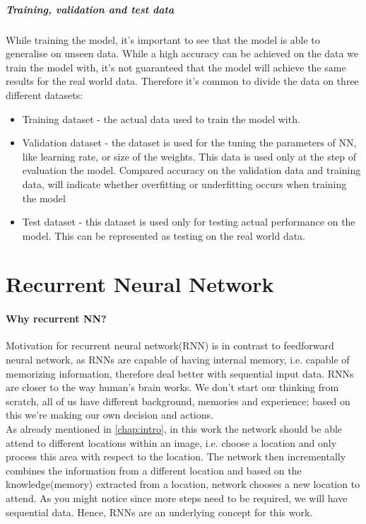 \subparagraph{Training, validation and test data} While training the model,
it's important to see that the model is able to generalise on unseen data.
While a high accuracy can be achieved on the data we train the model with, it's
not guaranteed that the model will achieve the same results for the real world
data. Therefore it's common to divide the data on three different datasets:
\begin{itemize}
	\item Training dataset - the actual data used to train the model with.
	\item Validation dataset - the dataset is used for the tuning the parameters of \gls{NN},
		like learning rate, or size of the weights.
		This data is used only at the step of evaluation the model.
		Compared accuracy on the validation data and training data, will indicate
		whether overfitting or underfitting occurs when training the model
	\item Test dataset - this dataset is used only for testing actual
		performance on the model. This can be represented as testing on the
		real world data.
\end{itemize}

\section{Recurrent Neural Network} \label{sec:rec_NN}

\paragraph{Why recurrent \gls{NN}?} Motivation for recurrent neural network(\gls{RNN}) is
in contrast to feedforward neural network, as RNNs are capable of having internal memory,
i.e. capable of memorizing information, therefore deal better with sequential input data.
RNNs are closer to the way human's brain works. We don't start our thinking from scratch,
all of us have different background, memories and experience; based on this
we're making our own decision and actions. \\
As already mentioned in \autoref{chap:intro}, in this work
the network should be able attend to different locations within an image, i.e.
choose a location and only process this area with respect to the location. The network then
incrementally combines the information from a different location and based
on the knowledge(memory) extracted from a location, network chooses a new location to
attend. As you might notice since more steps need to be required, we will have sequential
data. Hence, RNNs are an underlying concept for this work.

